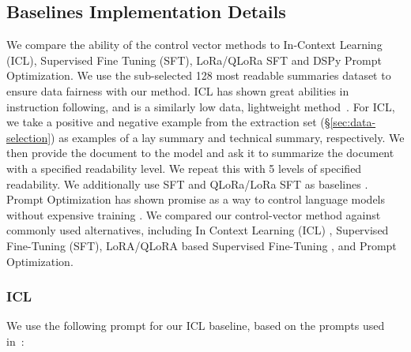 
\subsection{Baselines Implementation Details}\label{sec:base-details}
We compare the ability of the control vector methods to In-Context Learning (ICL), Supervised Fine Tuning (SFT), LoRa/QLoRa SFT and DSPy Prompt Optimization. We use the sub-selected 128 most readable summaries dataset to ensure data fairness with our method.
 ICL has shown great abilities in instruction following, and is a similarly low data, lightweight method~\cite{Brown2020LanguageMA}. For ICL, we take a positive and negative example from the extraction set (\S\ref{sec:data-selection}) as examples of a lay summary and technical summary, respectively. We then provide the document to the model and ask it to summarize the document with a specified readability level. We repeat this with 5 levels of specified readability. We additionally use SFT and QLoRa/LoRa SFT as baselines \cite{hu2021loralowrankadaptationlarge, dettmers2023qloraefficientfinetuningquantized}. Prompt Optimization has shown promise as a way to control language models without expensive training \cite{khattab2023dspycompilingdeclarativelanguage}. 
We compared our control-vector method against commonly used alternatives, including In Context Learning (ICL) \cite{Brown2020LanguageMA}, Supervised Fine-Tuning (SFT), LoRA/QLoRA based Supervised Fine-Tuning \cite{hu2021loralowrankadaptationlarge, dettmers2023qloraefficientfinetuningquantized}, and Prompt Optimization.
\subsubsection{ICL}
We use the following prompt for our ICL baseline, based on the prompts used in~\cite{ribeiro-etal-2023-generating}:

